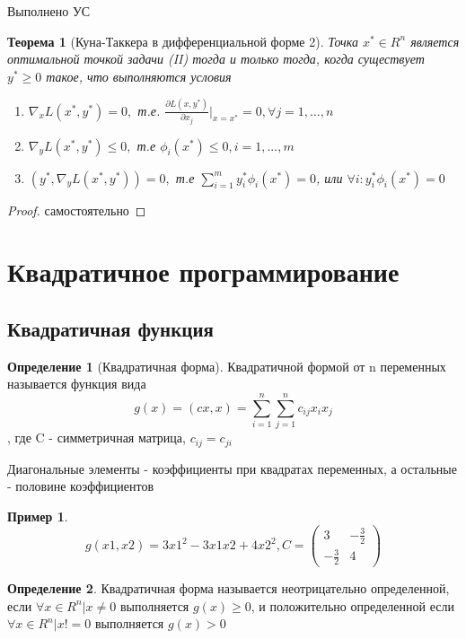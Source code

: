 \documentclass[a4paper]{article}
\newtheorem{theorem}{Теорема}[section]
\theoremstyle{definition}
\newtheorem*{example}{Пример}
\newtheorem*{definition}{Определение}
\theoremstyle{remark}
\begin{document}
Выполнено УС

\begin{theorem}[Куна-Таккера в дифференциальной форме 2]
    Точка $x^*\in R^n$ является оптимальной точкой задачи (II)
    тогда и только тогда, когда существует $y^*\ge 0$ такое, что выполняются условия
    \begin{enumerate}
        \item $\nabla_x L(x^*, y^*) = 0,$ т.е.
        $\frac{\partial L(x, y^*)}{\partial x_j} |_{x = x^*} = 0, \forall j = 1, \dots, n$
        \item $\nabla_y L(x^*, y^*) \le 0,$ т.е $\phi_i(x^*)\le 0, i = 1, ..., m$
        \item $(y^*, \nabla_y L(x^*, y^*)) = 0, $ т.е $\sum_{i = 1}^{m}y^*_i \phi_i(x^*) = 0$, или $\forall i: y^*_i \phi_i(x^*) = 0$
    \end{enumerate}
\end{theorem}
\begin{proof}
    самостоятельно
\end{proof}
\section{Квадратичное программирование}
\subsection{Квадратичная функция}
\begin{definition}[Квадратичная форма]
    Квадратичной формой от n переменных называется функция вида
    \[g(x)  = (cx, x) = \sum_{i=1}^{n}\sum_{j=1}^{n}c_{ij}x_i x_j\], где C - симметричная матрица, $c_{ij} = c_{ji}$

    Диагональные элементы - коэффициенты при квадратах переменных, а остальные - половине коэффициентов
\end{definition}
\begin{example}
    \[g(x1, x2) = 3x1^2 -3x1x2 + 4x2^2, C =\begin{pmatrix}
        3 & -\frac32\\
        -\frac32 & 4
        \end{pmatrix}\]
    
\end{example}
\begin{definition}
    Квадратичная форма называется неотрицательно определенной, если $\forall x\in R^n  | x\neq 0$ выполняется $g(x)\ge 0$, и положительно определенной если $\forall x\in R^n  | x!= 0$ выполняется $g(x) > 0$
\end{definition}
\end{document}
